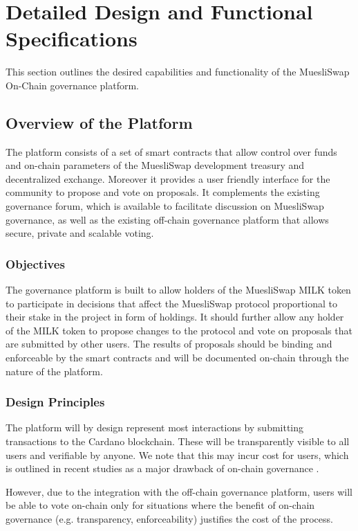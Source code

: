 \documentclass[11pt]{article}
\begin{document}
\section{Detailed Design and Functional Specifications}

This section outlines the desired capabilities and functionality of the MuesliSwap On-Chain governance platform.

\subsection{Overview of the Platform}
The platform consists of a set of smart contracts that allow control over funds and on-chain parameters
of the MuesliSwap development treasury and decentralized exchange.
Moreover it provides a user friendly interface for the community to propose and vote on proposals.
It complements the existing governance forum, which is available to facilitate discussion on MuesliSwap governance,
as well as the existing off-chain governance platform that allows secure, private and scalable voting.

\subsubsection{Objectives}
The governance platform is built to allow holders of the MuesliSwap MILK token to participate in
decisions that affect the MuesliSwap protocol proportional to their stake in the project in form of holdings.
It should further allow any holder of the MILK token to propose changes to the protocol and
vote on proposals that are submitted by other users.
The results of proposals should be binding and enforceable by the smart contracts and will be documented
on-chain through the nature of the platform.

\subsubsection{Design Principles}

The platform will by design represent most interactions by submitting transactions to the Cardano blockchain.
These will be transparently visible to all users and verifiable by anyone.
We note that this may incur cost for users, which is outlined in recent studies as a major drawback of on-chain governance \cite{feichtinger2023hidden}.

However, due to the integration with the off-chain governance platform, users will be able to vote on-chain
only for situations where the benefit of on-chain governance (e.g. transparency, enforceability) justifies the cost of the process.
\end{document}
